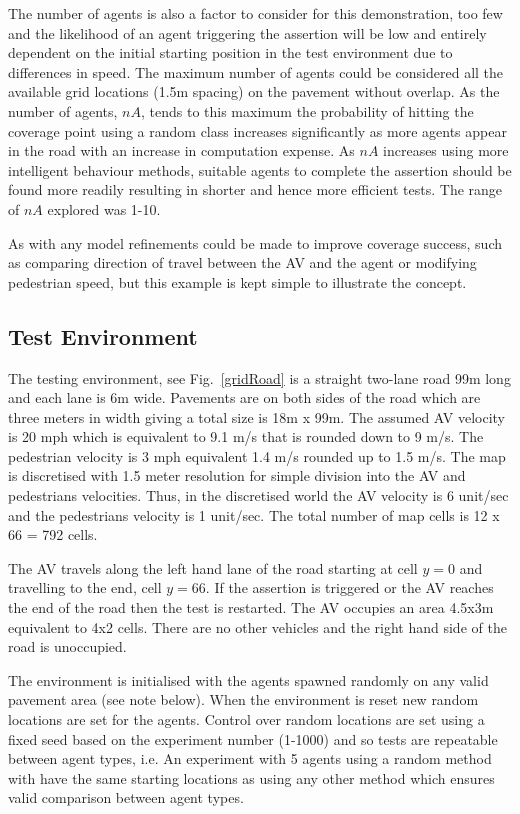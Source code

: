 \documentclass[letterpaper, 10 pt, journal, twoside]{IEEEtran}
\begin{document}
The number of agents is also a factor to consider for this demonstration, too few and the likelihood of an agent triggering the assertion will be low and entirely dependent on the initial starting position in the test environment due to differences in speed. The maximum number of agents could be considered all the available grid locations (1.5m spacing) on the pavement without overlap.
As the number of agents, $nA$, tends to this maximum the probability of hitting the coverage point using a random class increases significantly as more agents appear in the road with an increase in computation expense. As $nA$ increases using more intelligent behaviour methods, suitable agents to complete the assertion should be found more readily resulting in shorter and hence more efficient tests. The range of $nA$  explored was 1-10.

As with any model refinements could be made to improve coverage success, such as comparing direction of travel between the AV and the agent or modifying pedestrian speed, but this example is kept simple to illustrate the concept. 

\subsection{Test Environment}
The testing environment, see Fig.~\ref{gridRoad} is a straight two-lane road 99m long and each lane is 6m wide. Pavements are on both sides of the road which are three meters in width giving a total size is 18m x 99m. 
%
The assumed AV velocity is 20 mph which is equivalent to 9.1 m/s that is rounded down to 9 m/s. The pedestrian velocity is 3 mph equivalent 1.4 m/s rounded up to 1.5 m/s. The map is discretised with 1.5 meter resolution for simple division into the AV and pedestrians velocities. Thus, in the discretised world the AV velocity is 6 unit/sec and the pedestrians velocity is 1 unit/sec. The total number of map cells is 12 x 66 = 792 cells. 

The AV travels along the left hand lane of the road starting at cell $y=0$ and travelling to the end, cell $y=66$. If the assertion is triggered or the AV reaches the end of the road then the test is restarted. The AV occupies an area 4.5x3m equivalent to 4x2 cells. There are no other vehicles and the right hand side of the road is unoccupied.

The environment is initialised with the agents spawned randomly on any valid pavement area (see note below). When the environment is reset new random locations are set for the agents. Control over random locations are set using a fixed seed based on the experiment number (1-1000) and so tests are repeatable between agent types, i.e. An experiment with 5 agents using a random method with have the same starting locations as using any other method which ensures valid comparison between agent types.
\end{document}
